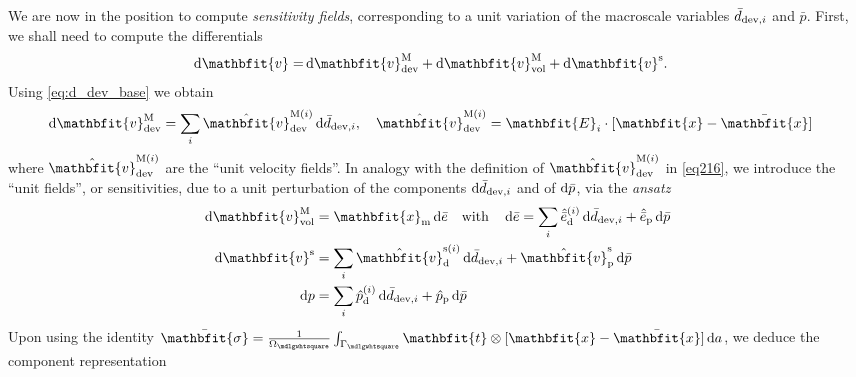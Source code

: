 \documentclass[12pt,a4paper,fleqn]{article}
\renewcommand{\ta}[1]{\mathbfit{#1}}
\renewcommand{\ts}[1]{\mathbfit{#1}}
\renewcommand{\Box}{\mdlgwhtsquare}
\newcommand{\ded}{\mathrm{d}}
\newcommand{\dep}{\mathrm{p}}
\begin{document}
We are now in the position to compute \emph{sensitivity fields}, corresponding to a unit variation of the macroscale variables $\bar{d}_{\mathrm{dev},i}$ and $\bar{p}$. First, we shall need to compute the differentials
\begin{align}
    \dif\ta{v}
     = &
    \dif\ta{v}^\macro_\dev + \dif\ta{v}^\macro_\vol + \dif\ta{v}^\fluct.
\label{eq:dv}
\end{align}
Using \eqref{eq:d_dev_base} we obtain
\begin{align}
  \dif \ta{v}^{\macro}_\dev &= \sum_{i} \hat{\ta{v}}^{\macro(i)}_\dev \dif\bar{d}_{\dev,i}, \quad  \hat{\ta{v}}^{\macro(i)}_\dev = \ts E_i \cdot [\ta x - \bar{\ta x}]
\label{eq216}
\end{align}
where $\hat{\ta{v}}^{\macro(i)}_\dev$ are the ``unit velocity fields''. In analogy with the definition of $\hat{\ta{v}}^{\macro(i)}_\dev$
in \eqref{eq216}, we introduce the ``unit fields'', or sensitivities, due to a unit perturbation of the components $\operatorname{d \!}\bar{d}_{\mathrm{dev},i}$ and of $\operatorname{d \!}\bar{p}$, via the \emph{ansatz}
\begin{align}
    \dif\ta{v}^\macro_\vol & = \ta x_\mean \dif \bar{e} \quad\mbox{with}\quad
    \dif\bar{e} = \sum_i \hat{\bar{e}}_{\ded}^{(i)}\dif\bar{d}_{\dev,i} + \hat{\bar{e}}_{\dep} \dif \bar{p}
\\
    \dif\ta v^\fluct &= \sum_i \hat{\ta{v}}_{\ded}^{\fluct(i)}\dif\bar{d}_{\dev,i} + \hat{\ta v}_{\dep}^\fluct \dif \bar{p}
\\
    \dif p  &= \sum_i \hat{p}^{(i)}_{\ded}\dif\bar{d}_{\dev,i} + \hat{p}_{\dep} \dif \bar{p}
\end{align}
Upon using the identity $\bar{\ts\sigma}=\frac{1}{\Omega_\Box} \int_{\Gamma_\Box} \ts t \outerp [\ta x - \bar{\ta x}]\dif a$, we deduce the component representation
\end{document}
